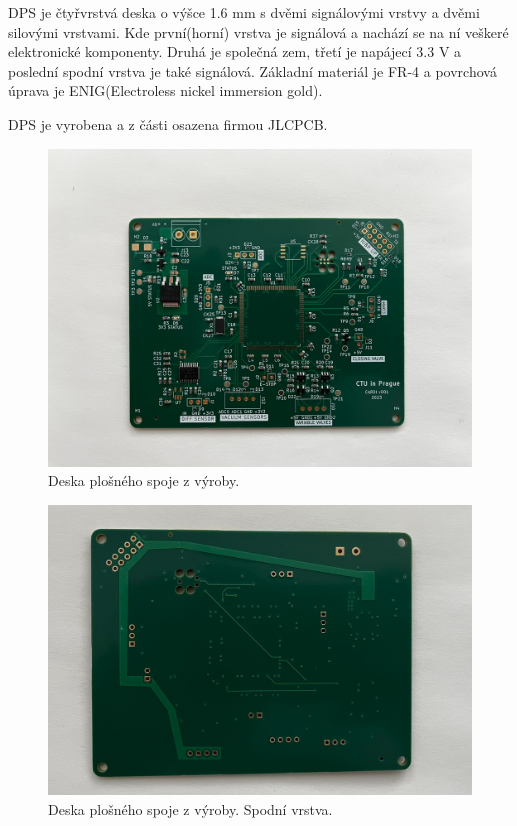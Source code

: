 DPS je čtyřvrstvá deska o výšce 1.6 mm s dvěmi signálovými vrstvy a dvěmi silovými vrstvami. Kde první(horní) vrstva je signálová a nachází se na ní veškeré elektronické komponenty. Druhá je společná zem, třetí je napájecí 3.3 V a poslední spodní vrstva je také signálová.
Základní materiál je FR-4 a povrchová úprava je ENIG(Electroless nickel immersion gold).
\par
DPS je vyrobena a z části osazena firmou JLCPCB.
\begin{figure}[H]
    \includegraphics[width=0.9\linewidth]{pictures/pcb_from_production.jpg}
    \caption{Deska plošného spoje z výroby.}
    \label{fig:pcb_production}
\end{figure}
\begin{figure}[H]
    \includegraphics[width=0.9\linewidth]{pictures/pcb_production_bottom.jpg}
    \caption{Deska plošného spoje z výroby. Spodní vrstva.}
    \label{fig:pcb_production_bottom}
\end{figure}

